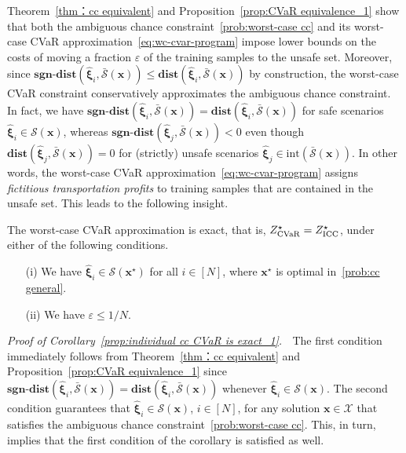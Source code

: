 \documentclass[nonblindrev]{informs2017}
\newcommand{\bmh}[1]{\hat{\bm{#1}}}
\newcommand{\1}[1]{\mathds{1}{\left(#1\right)}}
\begin{document}
Theorem~\ref{thm：cc equivalent} and Proposition~\ref{prop:CVaR equivalence_1} show that both the ambiguous chance constraint~\eqref{prob:worst-case cc} and its worst-case CVaR approximation~\eqref{eq:wc-cvar-program} impose lower bounds on the costs of moving a fraction $\varepsilon$ of the training samples to the unsafe set. Moreover, since $\mathbf{sgn\textbf{-}dist} (\bmh{\xi}_i, \bar{\mathcal{S}} (\bm{x})) \leq \mathbf{dist} (\bmh{\xi}_i, \bar{\mathcal{S}} (\bm{x}))$ by construction, the worst-case CVaR constraint conservatively approximates the ambiguous chance constraint. In fact, we have $\mathbf{sgn\textbf{-}dist} (\bmh{\xi}_i, \bar{\mathcal{S}} (\bm{x})) = \mathbf{dist} (\bmh{\xi}_i, \bar{\mathcal{S}} (\bm{x}))$ for safe scenarios $\bmh{\xi}_i \in \mathcal{S} (\bm{x})$, whereas $\mathbf{sgn\textbf{-}dist} (\bmh{\xi}_j, \bar{\mathcal{S}} (\bm{x})) < 0$ even though $\mathbf{dist} (\bmh{\xi}_j, \bar{\mathcal{S}} (\bm{x})) = 0$ for (strictly) unsafe scenarios $\bmh{\xi}_j \in \text{int}(\bar{\mathcal{S}} (\bm{x}))$. In other words, the worst-case CVaR approximation~\eqref{eq:wc-cvar-program} assigns \emph{fictitious transportation profits} to training samples that are contained in the unsafe set. This leads to the following insight.

\begin{corollary}\label{prop:individual cc CVaR is exact_1}
The worst-case CVaR approximation is exact, that is, $Z^\star_{\rm CVaR}= Z^\star_{\rm ICC}$, under either of the following conditions.
\begin{itemize}
\item[(i)] We have $\bmh{\xi}_i \in \mathcal{S}(\bm{x}^\star)$ for all $i \in [N]$, where $\bm{x}^\star$ is optimal in~\eqref{prob:cc general}.
\item[(ii)] We have $\varepsilon \leq 1/N$. 
\end{itemize}
\end{corollary}

\noindent \emph{Proof of Corollary~\ref{prop:individual cc CVaR is exact_1}.} $\;$
The first condition immediately follows from Theorem~\ref{thm：cc equivalent} and Proposition~\ref{prop:CVaR equivalence_1} since $\mathbf{sgn\textbf{-}dist} (\bmh{\xi}_i, \bar{\mathcal{S}} (\bm{x})) = \mathbf{dist} (\bmh{\xi}_i, \bar{\mathcal{S}} (\bm{x}))$ whenever $\bmh{\xi}_i \in \mathcal{S} (\bm{x})$. The second condition guarantees that $\bmh{\xi}_i \in \mathcal{S} (\bm{x})$, $i \in [N]$, for
any solution $\bm{x} \in \mathcal{X}$ that satisfies the ambiguous chance constraint~\eqref{prob:worst-case cc}. This, in turn, implies that the first condition of the corollary is satisfied as well.
\hfill \Halmos
\endproof
\end{document}
